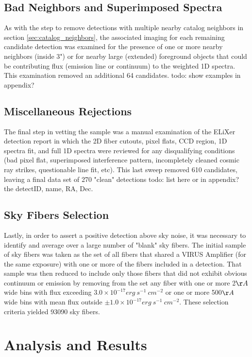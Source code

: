\documentclass{aastex62}
\begin{document}
\subsection{Bad Neighbors and Superimposed Spectra}
As with the step to remove detections with multiple nearby catalog neighbors in section \ref{sec:catalog_neighbors}, the associated imaging for each remaining candidate detection was examined for the presence of one or more nearby neighbors (inside 3") or for nearby large (extended) foreground objects that could be contributing flux (emission line or continuum) to the weighted 1D spectra. This examination removed an additional 64 candidates.
{ \color{red} todo: show examples in appendix?}


\subsection{Miscellaneous Rejections}
The final step in vetting the sample was a manual examination of the ELiXer detection report in which the 2D fiber cutouts, pixel flats, CCD region, 1D spectra fit, and full 1D spectra were reviewed for any disqualifying conditions (bad pixel flat, superimposed interference pattern, incompletely cleaned cosmic ray strikes, questionable line fit, etc). This last sweep removed 610 candidates, leaving a final data set of 270 "clean" detections { \color{red} todo: list here or in appendix? the detectID, name, RA, Dec}.  


\subsection{Sky Fibers Selection}

Lastly, in order to assert a positive detection above sky noise, it was necessary to identify and average over a large number of "blank" sky fibers. The initial sample of sky fibers was taken as the set of all fibers that shared a VIRUS Amplifier (for the same exposure) with one or more of the fibers included in a detection. That sample was then reduced to include only those fibers that did not exhibit obvious continuum or emission by removing from the set any fiber with one or more 2$\AA$ wide bins with flux exceeding $3.0\times 10^{-17} erg\ s^{-1}\ cm^{-2}$ or one or more 500$\AA$ wide bins with mean flux outside $\pm 1.0 \times 10^{-17} erg\ s^{-1}\ cm^{-2}$. These selection criteria yielded 93090 sky fibers.  

\section{Analysis and Results} \label{sec:analysis}
\end{document}
